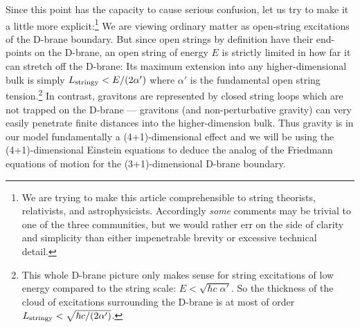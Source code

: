 \documentclass[a4paper,12pt]{article}
\begin{document}
Since this point has the capacity to cause serious confusion, let us
try to make it a little more explicit:\footnote{
We are trying to make this article comprehensible to string theorists,
relativists, and astrophysicists. Accordingly {\em some} comments may
be trivial to one of the three communities, but we would rather err on
the side of clarity and simplicity than either impenetrable brevity or
excessive technical detail.}
We are viewing ordinary matter as open-string excitations of the
D-brane boundary. But since open strings by definition have their
end-points on the D-brane, an open string of energy $E$ is strictly
limited in how far it can stretch off the D-brane: Its maximum
extension into any higher-dimensional bulk is simply
$L_{\mathrm{stringy}}<E/(2\alpha')$ where $\alpha'$ is the fundamental open
string tension.\footnote{
This whole D-brane picture only makes sense for string excitations of
low energy compared to the string scale: $E<\sqrt{\hbar c \;
\alpha'}$.  So the thickness of the cloud of excitations surrounding
the D-brane is at most of order $L_{\mathrm{stringy}}<\sqrt{\hbar c
/(2\alpha')}$.}
In contrast, gravitons are represented by closed string loops which
are not trapped on the D-brane --- gravitons (and non-perturbative
gravity) can very easily penetrate finite distances into the
higher-dimension bulk. Thus gravity is in our model fundamentally a
(4+1)-dimensional effect and we will be using the (4+1)-dimensional
Einstein equations to deduce the analog of the Friedmann equations of
motion for the (3+1)-dimensional D-brane boundary.
\end{document}
